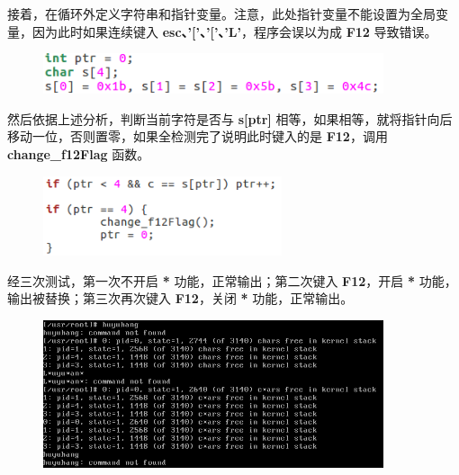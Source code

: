 \begin{itemize}
\begin{enumerate}
\begin{figure}[htbp]
                                \end{figure}
                            \newpage
                            \par 接着，在循环外定义字符串和指针变量。注意，此处指针变量不能设置为全局变量，因为此时如果连续键入 \textbf{esc、'['、'['、'L'}，程序会误以为成 \textbf{F12} 导致错误。
                                \begin{figure}[htbp]
                                    \hspace*{2.3cm}
                                    \includegraphics*[width = 10cm]{s2_5.png}
                                \end{figure}
                            \par 然后依据上述分析，判断当前字符是否与 \textbf{s[ptr]} 相等，如果相等，就将指针向后移动一位，否则置零，如果全检测完了说明此时键入的是 \textbf{F12}，调用 \textbf{change\_f12Flag} 函数。
                                \begin{figure}[htbp]
                                    \hspace*{2.3cm}
                                    \includegraphics*[width = 7cm]{s2_6.png}
                                \end{figure}
                    \end{enumerate}
            \end{itemize}
            \par 经三次测试，第一次不开启 \textbf{*} 功能，正常输出；第二次键入 \textbf{F12}，开启 \textbf{*} 功能，输出被替换；第三次再次键入 \textbf{F12}，关闭 \textbf{*} 功能，正常输出。
                \begin{figure}[htbp]
                    \hspace*{1.5cm}
                    \includegraphics*[width = 10cm]{s2_10.png}
                \end{figure}
        \newpage
